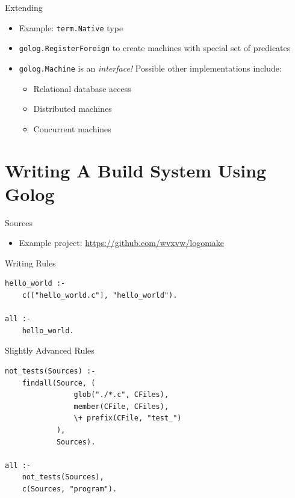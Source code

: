 \documentclass[presentation]{beamer}
\begin{document}
\begin{frame}[fragile,label=sec-3-9]{Extending}
 \begin{itemize}
\item Example: \texttt{term.Native} type
\item \texttt{golog.RegisterForeign} to create machines with special set of
predicates
\item \texttt{golog.Machine} is an \emph{interface!} Possible other implementations
include:
\begin{itemize}
\item Relational database access
\item Distributed machines
\item Concurrent machines
\end{itemize}
\end{itemize}
\end{frame}

\section{Writing A Build System Using Golog}
\label{sec-4}

\begin{frame}[label=sec-4-1]{Sources}
\begin{itemize}
\item Example project: \url{https://github.com/wvxvw/logomake}
\end{itemize}
\end{frame}

\begin{frame}[fragile,label=sec-4-2]{Writing Rules}
 \begin{verbatim}
hello_world :-
    c(["hello_world.c"], "hello_world").

all :-
    hello_world.
\end{verbatim}
\end{frame}

\begin{frame}[fragile,label=sec-4-3]{Slightly Advanced Rules}
 \begin{verbatim}
not_tests(Sources) :-
    findall(Source, (
                glob("./*.c", CFiles),
                member(CFile, CFiles),
                \+ prefix(CFile, "test_")
            ),
            Sources).

all :-
    not_tests(Sources),
    c(Sources, "program").
\end{verbatim}
\end{frame}
\end{document}
